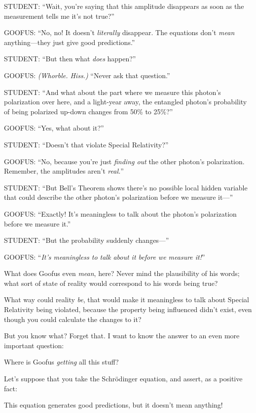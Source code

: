 {
 STUDENT: ``Wait, you're saying
that this amplitude disappears as soon as the measurement tells me
it's not true?''}

{
 GOOFUS: ``No, no! It doesn't
\textit{literally} disappear. The equations don't
\textit{mean} anything---they just give good
predictions.''}

{
 STUDENT: ``But then what \textit{does}
happen?''}

{
 GOOFUS: \textit{(Whorble. Hiss.)} ``Never ask
that question.''}

{
 STUDENT: ``And what about the part where we
measure this photon's polarization over here, and a
light-year away, the entangled photon's probability of
being polarized up-down changes from 50\% to 25\%?''}

{
 GOOFUS: ``Yes, what about
it?''}

{
 STUDENT: ``Doesn't that violate
Special Relativity?''}

{
 GOOFUS: ``No, because you're just
\textit{finding out} the other photon's polarization.
Remember, the amplitudes aren't
\textit{real.}''}

{
 STUDENT: ``But Bell's Theorem
shows there's no possible local hidden variable that
could describe the other photon's polarization before
we measure it---''}

{
 GOOFUS: ``Exactly! It's
meaningless to talk about the photon's polarization
before we measure it.''}

{
 STUDENT: ``But the probability suddenly
changes---''}

{
 GOOFUS: ``\textit{It's
meaningless to talk about it before we measure
it!}''}

{
 What does Goofus even \textit{mean}, here? Never mind the
plausibility of his words; what sort of state of reality would
correspond to his words being true?}

{
 What way could reality \textit{be}, that would make it meaningless
to talk about Special Relativity being violated, because the property
being influenced didn't exist, even though you could
calculate the changes to it?}

{
 But you know what? Forget that. I want to know the answer to an
even more important question:}

{
 Where is Goofus \textit{getting} all this stuff?}

{
 Let's suppose that you take the Schrödinger
equation, and assert, as a positive fact:}

{
 This equation generates good predictions, but it
doesn't mean anything!}


